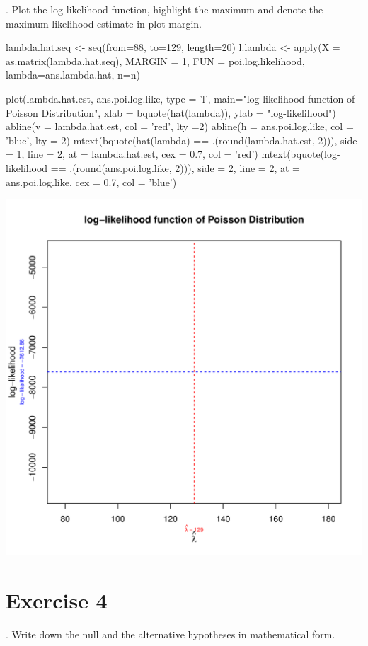 \documentclass[12pt, oneside]{report}\usepackage[]{graphicx}\usepackage[]{color}
\makeatletter
\def\maxwidth{ %
  \ifdim\Gin@nat@width>\linewidth
    \linewidth
  \else
    \Gin@nat@width
  \fi
}
\makeatother
\begin{document}
. Plot the log-likelihood function, highlight the maximum and denote the maximum likelihood
estimate in plot margin.
\begin{Schunk}
\begin{Sinput}
lambda.hat.seq <- seq(from=88, to=129, length=20)
l.lambda <- apply(X = as.matrix(lambda.hat.seq), MARGIN = 1, FUN = poi.log.likelihood, lambda=ans.lambda.hat, n=n)

plot(lambda.hat.est, ans.poi.log.like, type = 'l', main="log-likelihood function of Poisson Distribution", xlab = bquote(hat(lambda)), ylab = "log-likelihood")
abline(v = lambda.hat.est, col = 'red', lty =2)
abline(h = ans.poi.log.like, col = 'blue', lty = 2)
mtext(bquote(hat(lambda) == .(round(lambda.hat.est, 2))), side = 1, line = 2,
      at = lambda.hat.est, cex = 0.7, col = 'red')
mtext(bquote(log-likelihood == .(round(ans.poi.log.like, 2))), side = 2, line = 2,
      at = ans.poi.log.like, cex = 0.7, col = 'blue')
\end{Sinput}

\includegraphics[width=\maxwidth]{figure/unnamed-chunk-3-1} \end{Schunk}

\section*{Exercise 4}
. Write down the null and the alternative hypotheses in mathematical form. \newline
\end{document}
